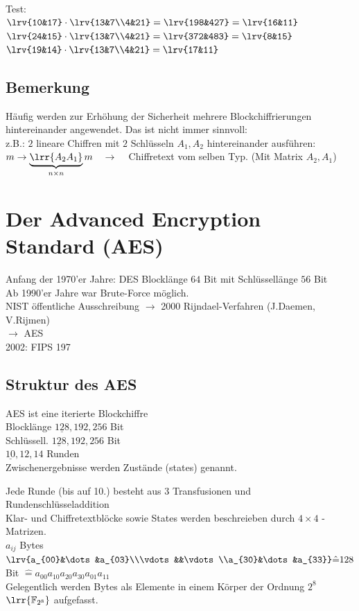 		Test:\\
		$\lrv{10&17}\cdot\lrv{13&7\\4&21}=\lrv{198&427}=\lrv{16&11}$\\
		$\lrv{24&15}\cdot\lrv{13&7\\4&21}=\lrv{372&483}=\lrv{8&15}$\\
		$\lrv{19&14}\cdot\lrv{13&7\\4&21}=\lrv{17&11}$
		
	\subsection{Bemerkung}
		Häufig werden zur Erhöhung der Sicherheit mehrere Blockchiffrierungen hintereinander angewendet. Das ist nicht immer sinnvoll:\\
		z.B.: $2$ lineare Chiffren mit $2$ Schlüsseln $A_1,A_2$ hintereinander ausführen:\\
		$m\rightarrow\underbrace{\lrr{A_2A_1}}_{n\times n} m \quad \rightarrow\quad$ Chiffretext vom selben Typ. (Mit Matrix $A_2,A_1$)
		
\section{Der Advanced Encryption Standard (AES)}
	Anfang der 1970'er Jahre: DES Blocklänge $64$ Bit mit Schlüssellänge $56$ Bit\\
	Ab 1990'er Jahre war Brute-Force möglich.\\
	NIST öffentliche Ausschreibung $\rightarrow$	2000 Rijndael-Verfahren (J.Daemen, V.Rijmen)\\
	$\rightarrow$ AES\\
	2002: FIPS 197
	
	\subsection{Struktur des AES}
		AES ist eine iterierte Blockchiffre\\
		Blocklänge $\underline{128},192,256$ Bit\\
		Schlüssell. $\underline{128},192,256$ Bit\\
		$\underline{10},12,14$ Runden\\
		Zwischenergebnisse werden Zustände (states) genannt.
		
		Jede Runde (bis auf 10.) besteht aus 3 Transfusionen und Rundenschlüsseladdition\\
		Klar- und Chiffretextblöcke sowie States werden beschreieben durch $4\times 4$ - Matrizen.\\
		$a_{ij}$ Bytes $\lrv{a_{00}&\dots&a_{03}\\\vdots&&\vdots\\a_{30}&\dots&a_{33}}\hat{=} 128$ Bit $\hat{=} a_{00}a_{10}a_{20}a_{30}a_{01}a_{11}$\\
		Gelegentlich werden Bytes als Elemente in einem Körper der Ordnung $2^8$ $\lrr{\mathbb{F}_{2^8}}$ aufgefasst.
\newpage
	
